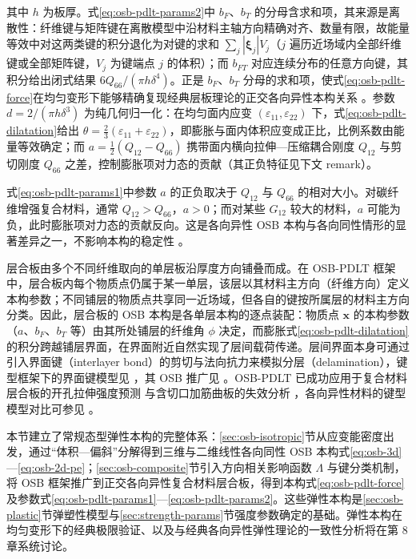 其中 $h$ 为板厚。式\eqref{eq:osb-pdlt-params2}中 $b_{F}$、$b_{T}$ 的分母含求和项，其来源是离散性：纤维键与矩阵键在离散模型中沿材料主轴方向精确对齐、数量有限，故能量等效中对这两类键的积分退化为对键的求和 $\sum_{j}|\boldsymbol{\xi}_{j}|V_{j}$（$j$ 遍历近场域内全部纤维键或全部矩阵键，$V_{j}$ 为键端点 $j$ 的体积）；而 $b_{FT}$ 对应连续分布的任意方向键，其积分给出闭式结果 $6Q_{66}/(\pi h\delta^{4})$。正是 $b_{F}$、$b_{T}$ 分母的求和项，使式\eqref{eq:osb-pdlt-force}在均匀变形下能够精确复现经典层板理论的正交各向异性本构关系 \cite{MadenciOterkus2014}。参数 $d=2/(\pi h\delta^{3})$ 为纯几何归一化：在均匀面内应变 $(\varepsilon_{11},\varepsilon_{22})$ 下，式\eqref{eq:osb-pdlt-dilatation}给出 $\theta=\tfrac{2}{3}(\varepsilon_{11}+\varepsilon_{22})$，即膨胀与面内体积应变成正比，比例系数由能量等效确定；而 $a=\tfrac{1}{2}(Q_{12}-Q_{66})$ 携带面内横向拉伸—压缩耦合刚度 $Q_{12}$ 与剪切刚度 $Q_{66}$ 之差，控制膨胀项对力态的贡献（其正负特征见下文 remark）。

\begin{remark}
  式\eqref{eq:osb-pdlt-params1}中参数 $a$ 的正负取决于 $Q_{12}$ 与 $Q_{66}$ 的相对大小。对碳纤维增强复合材料，通常 $Q_{12}>Q_{66}$，$a>0$；而对某些 $G_{12}$ 较大的材料，$a$ 可能为负，此时膨胀项对力态的贡献反向。这是各向异性 OSB 本构与各向同性情形的显著差异之一，不影响本构的稳定性 \cite{MadenciOterkus2014}。
\end{remark}

层合板由多个不同纤维取向的单层板沿厚度方向铺叠而成。在 OSB-PDLT 框架中，层合板内每个物质点仍属于某一单层，该层以其材料主方向（纤维方向）定义本构参数；不同铺层的物质点共享同一近场域，但各自的键按所属层的材料主方向分类。因此，层合板的 OSB 本构是各单层本构的逐点装配：物质点 $\mathbf{x}$ 的本构参数（$a$、$b_{F}$、$b_{T}$ 等）由其所处铺层的纤维角 $\phi$ 决定，而膨胀式\eqref{eq:osb-pdlt-dilatation}的积分跨越铺层界面，在界面附近自然实现了层间载荷传递。层间界面本身可通过引入界面键（interlayer bond）的剪切与法向抗力来模拟分层（delamination），键型框架下的界面键模型见 \cite{OterkusMadenci2012}，其 OSB 推广见 \cite{MadenciOterkus2014}。OSB-PDLT 已成功应用于复合材料层合板的开孔拉伸强度预测 \cite{JiangWang2018} 与含切口加筋曲板的失效分析 \cite{Oterkus2012Combined}，各向异性材料的键型模型对比可参见 \cite{HuHaBobaru2012,Ghajari2014}。

本节建立了常规态型弹性本构的完整体系：\ref{sec:osb-isotropic}节从应变能密度出发，通过“体积—偏斜”分解得到三维与二维线性各向同性 OSB 本构式\eqref{eq:osb-3d}—\eqref{eq:osb-2d-pe}；\ref{sec:osb-composite}节引入方向相关影响函数 $\Lambda$ 与键分类机制，将 OSB 框架推广到正交各向异性复合材料层合板，得到本构式\eqref{eq:osb-pdlt-force}及参数式\eqref{eq:osb-pdlt-params1}—\eqref{eq:osb-pdlt-params2}。这些弹性本构是\ref{sec:osb-plastic}节弹塑性模型与\ref{sec:strength-params}节强度参数确定的基础。弹性本构在均匀变形下的经典极限验证、以及与经典各向异性弹性理论的一致性分析将在第 8 章系统讨论。

